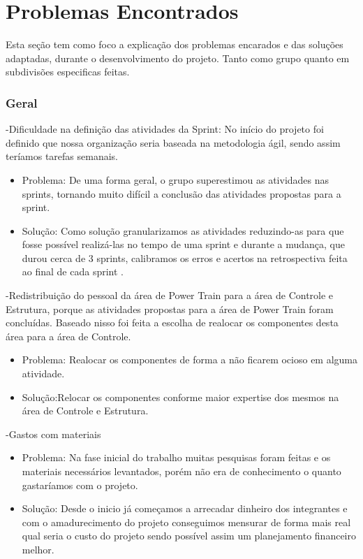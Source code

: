 \chapter[Problemas Encontrados]{Problemas Encontrados}

Esta seção tem como foco a explicação dos problemas encarados e das soluções adaptadas, durante o desenvolvimento do projeto. Tanto como grupo quanto em subdivisões especificas feitas.

 \subsection{Geral}

-Dificuldade na definição das atividades da Sprint: No início do projeto foi definido que nossa organização seria baseada na metodologia ágil, sendo assim teríamos tarefas semanais.
    \begin{itemize}
      \item Problema: De uma forma geral, o grupo superestimou as atividades nas sprints, tornando muito difícil a conclusão das atividades propostas para a sprint.
	  \item Solução: Como solução granularizamos as atividades reduzindo-as para que fosse possível realizá-las no tempo de uma sprint e durante a mudança, que durou cerca de 3 sprints, calibramos os erros e acertos na retrospectiva feita ao final de cada sprint
.

    \end{itemize}

-Redistribuição do pessoal da área de Power Train para a área de Controle e Estrutura, porque as atividades propostas para a área de Power Train foram concluídas. Baseado nisso foi feita a escolha de realocar os componentes desta área para a área de Controle.
    \begin{itemize}
      \item Problema: Realocar os componentes de forma a não ficarem ocioso em alguma atividade.
	  \item Solução:Relocar os componentes conforme maior expertise dos mesmos na área de Controle e Estrutura.

    \end{itemize}

-Gastos com materiais
    \begin{itemize}
  \item Problema: Na fase inicial do trabalho muitas pesquisas foram feitas e os materiais necessários levantados, porém não era de conhecimento o quanto gastaríamos com o projeto.
  \item Solução: Desde o inicio já começamos a arrecadar dinheiro dos integrantes e com o amadurecimento do projeto conseguimos mensurar de forma mais real qual seria o custo do projeto sendo possível assim um planejamento financeiro melhor.

    \end{itemize}

